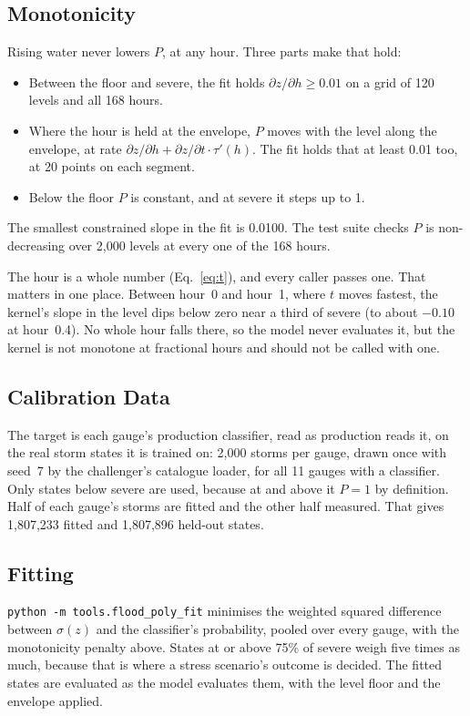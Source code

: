 \documentclass[11pt,a4paper]{article}
\newcommand{\fpFitStates}{1{,}807{,}233}
\newcommand{\fpTestStates}{1{,}807{,}896}
\newcommand{\fpMinSlope}{0.0100}
\begin{document}
\subsection{Monotonicity}
Rising water never lowers $P$, at any hour. Three parts make that hold:
\begin{itemize}[nosep]
    \item Between the floor and severe, the fit holds $\partial z/\partial h \ge 0.01$
          on a grid of 120 levels and all 168 hours.
    \item Where the hour is held at the envelope, $P$ moves with the level along the
          envelope, at rate
          $\partial z/\partial h + \partial z/\partial t \cdot \tau'(h)$. The fit holds
          that at least 0.01 too, at 20 points on each segment.
    \item Below the floor $P$ is constant, and at severe it steps up to 1.
\end{itemize}
The smallest constrained slope in the fit is \fpMinSlope{}. The test suite checks $P$
is non-decreasing over 2,000 levels at every one of the 168 hours.

The hour is a whole number (Eq.~\eqref{eq:t}), and every caller passes one. That
matters in one place. Between hour~0 and hour~1, where $t$ moves fastest, the kernel's
slope in the level dips below zero near a third of severe (to about $-0.10$ at
hour~0.4). No whole hour falls there, so the model never evaluates it, but the kernel
is not monotone at fractional hours and should not be called with one.

\mkminputs

\subsection{Calibration Data}\label{sec:calibration}
The target is each gauge's production classifier, read as production reads it, on the
real storm states it is trained on: 2,000 storms per gauge, drawn once with seed~7 by
the challenger's catalogue loader, for all 11 gauges with a classifier. Only states
below severe are used, because at and above it $P=1$ by definition. Half of each
gauge's storms are fitted and the other half measured. That gives \fpFitStates{}
fitted and \fpTestStates{} held-out states.

\subsection{Fitting}
\texttt{python -m tools.flood\_poly\_fit} minimises the weighted squared difference
between $\sigma(z)$ and the classifier's probability, pooled over every gauge, with
the monotonicity penalty above. States at or above 75\% of severe weigh five times as
much, because that is where a stress scenario's outcome is decided. The fitted states
are evaluated as the model evaluates them, with the level floor and the envelope
applied.
\end{document}
